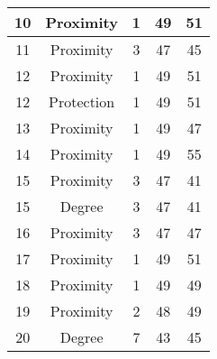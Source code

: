 \documentclass[results.tex]{subfiles}
\begin{document}
\begin{center}
\begin{tabular}{| c || c | c | c | c |}
            \hline
            10                      & Proximity                    & 1                      & 49                      & 51                   \\
            \hline
            11                      & Proximity                    & 3                      & 47                      & 45                   \\
            \hline
            12                      & Proximity                    & 1                      & 49                      & 51                   \\
            \hline
            12                      & Protection                   & 1                      & 49                      & 51                   \\
            \hline
            13                      & Proximity                    & 1                      & 49                      & 47                   \\
            \hline
            14                      & Proximity                    & 1                      & 49                      & 55                   \\
            \hline
            15                      & Proximity                    & 3                      & 47                      & 41                   \\
            \hline
            15                      & Degree                       & 3                      & 47                      & 41                   \\
            \hline
            16                      & Proximity                    & 3                      & 47                      & 47                   \\
            \hline
            17                      & Proximity                    & 1                      & 49                      & 51                   \\
            \hline
            18                      & Proximity                    & 1                      & 49                      & 49                   \\
            \hline
            19                      & Proximity                    & 2                      & 48                      & 49                   \\
            \hline
            20                      & Degree                       & 7                      & 43                      & 45                   \\

\end{tabular}
\end{center}
\end{document}

